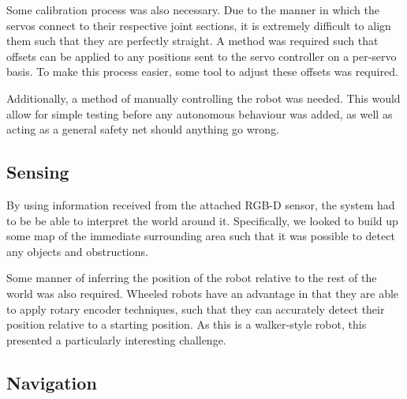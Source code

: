 Some calibration process was also necessary. Due to the manner in which the servos connect to their respective joint sections, it is extremely difficult to align them such that they are perfectly straight. A method was required such that offsets can be applied to any positions sent to the servo controller on a per-servo basis. To make this process easier, some tool to adjust these offsets was required.

Additionally, a method of manually controlling the robot was needed. This would allow for simple testing before any autonomous behaviour was added, as well as acting as a general safety net should anything go wrong.

\subsection{Sensing}

By using information received from the attached RGB-D sensor, the system had to be be able to interpret the world around it. Specifically, we looked to build up some map of the immediate surrounding area such that it was possible to detect any objects and obstructions.

Some manner of inferring the position of the robot relative to the rest of the world was also required. Wheeled robots have an advantage in that they are able to apply rotary encoder techniques, such that they can accurately detect their position relative to a starting position. As this is a walker-style robot, this presented a particularly interesting challenge.

\subsection{Navigation}